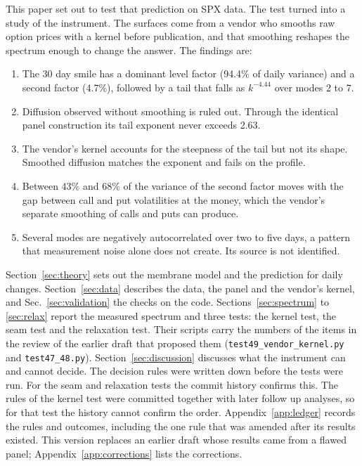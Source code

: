 \documentclass[11pt]{article}
\begin{document}
This paper set out to test that prediction on SPX data. The test turned into a study of the instrument. The surfaces come from a vendor who smooths raw option prices with a kernel before publication, and that smoothing reshapes the spectrum enough to change the answer. The findings are:

\begin{enumerate}
\item The 30 day smile has a dominant level factor (94.4\% of daily variance) and a second factor (4.7\%), followed by a tail that falls as $k^{-4.44}$ over modes 2 to 7.
\item Diffusion observed without smoothing is ruled out. Through the identical panel construction its tail exponent never exceeds 2.63.
\item The vendor's kernel accounts for the steepness of the tail but not its shape. Smoothed diffusion matches the exponent and fails on the profile.
\item Between 43\% and 68\% of the variance of the second factor moves with the gap between call and put volatilities at the money, which the vendor's separate smoothing of calls and puts can produce.
\item Several modes are negatively autocorrelated over two to five days, a pattern that measurement noise alone does not create. Its source is not identified.
\end{enumerate}

Section~\ref{sec:theory} sets out the membrane model and the prediction for daily changes. Section~\ref{sec:data} describes the data, the panel and the vendor's kernel, and Sec.~\ref{sec:validation} the checks on the code. Sections~\ref{sec:spectrum} to \ref{sec:relax} report the measured spectrum and three tests: the kernel test, the seam test and the relaxation test. Their scripts carry the numbers of the items in the review of the earlier draft that proposed them (\texttt{test49\_vendor\_kernel.py} and \texttt{test47\_48.py}). Section~\ref{sec:discussion} discusses what the instrument can and cannot decide. The decision rules were written down before the tests were run. For the seam and relaxation tests the commit history confirms this. The rules of the kernel test were committed together with later follow up analyses, so for that test the history cannot confirm the order. Appendix~\ref{app:ledger} records the rules and outcomes, including the one rule that was amended after its results existed. This version replaces an earlier draft whose results came from a flawed panel; Appendix~\ref{app:corrections} lists the corrections.
\end{document}
